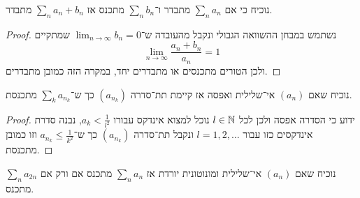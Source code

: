 \Subquestion{}
נוכיח כי אם $\sum_n a_n$ מתבדר ו־$\sum_n b_n$ מתכנס אז $\sum_n a_n + b_n$ מתבדר.
\begin{proof}
	נשתמש במבחן ההשוואה הגבולי ונקבל מהעובדה ש־$\lim_{n \to \infty} b_n = 0$ שמתקיים
	\[
		\lim_{n \to \infty} \frac{a_n + b_n}{a_n} = 1
	\]
	ולכן הטורים מתכנסים או מתבדרים יחד, במקרה הזה כמובן מתבדרים.
\end{proof}

\Subquestion{}
נוכיח שאם $(a_n)$ אי־שלילית ואפסה אז קיימת תת־סדרה $(a_{n_k})$ כך ש־$\sum_k a_{n_k}$ מתכנסת.
\begin{proof}
ידוע כי הסדרה אפסה ולכן לכל $l \in \mathbb{N}$ נוכל למצוא אינדקס עבורו $a_k < \frac{1}{l^2}$, נבנה סדרת אינדקסים כזו עבור $l = 1, 2, \dots$ ונקבל תת־סדרה $(a_{n_k})$ כך ש־$a_{n_k} \le \frac{1}{k^2}$ וזו כמובן מתכנסת.
\end{proof}

\Subquestion{}
נוכיח שאם $(a_n)$ אי־שלילית ומונוטונית יורדת אז $\sum_n a_n$ מתכנס אם ורק אם $\sum_n a_{2n}$ מתכנס.

